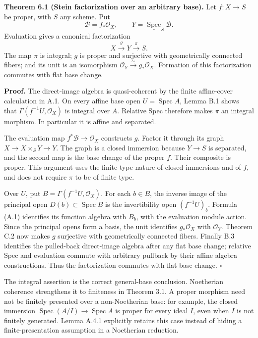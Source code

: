 \documentclass[11pt]{article}
\begin{document}
\textbf{Theorem 6.1 (Stein factorization over an arbitrary base).} Let
\(f:X\to S\) be proper, with \(S\) any scheme. Put \[
\mathcal B=f_*\mathcal O_X,
\qquad Y=\underline{\operatorname{Spec}}_S\mathcal B.
\] Evaluation gives a canonical factorization \[
X\xrightarrow{g}Y\xrightarrow{\pi}S.
\] The map \(\pi\) is integral; \(g\) is proper and surjective with
geometrically connected fibers; and its unit is an isomorphism
\(\mathcal O_Y\xrightarrow{\sim}g_*\mathcal O_X\). Formation of this
factorization commutes with flat base change.

\textbf{Proof.} The direct-image algebra is quasi-coherent by the finite
affine-cover calculation in A.1. On every affine base open
\(U=\operatorname{Spec}A\), Lemma B.1 shows that
\(\Gamma(f^{-1}U,\mathcal O_X)\) is integral over \(A\). Relative Spec
therefore makes \(\pi\) an integral morphism. In particular it is affine
and separated.

The evaluation map \(f^*\mathcal B\to\mathcal O_X\) constructs \(g\).
Factor it through its graph \(X\to X\times_SY\to Y\). The graph is a
closed immersion because \(Y\to S\) is separated, and the second map is
the base change of the proper \(f\). Their composite is proper. This
argument uses the finite-type nature of closed immersions and of \(f\),
and does not require \(\pi\) to be of finite type.

Over \(U\), put \(B=\Gamma(f^{-1}U,\mathcal O_X)\). For each \(b\in B\),
the inverse image of the principal open
\(D(b)\subset\operatorname{Spec}B\) is the invertibility open
\((f^{-1}U)_b\). Formula (A.1) identifies its function algebra with
\(B_b\), with the evaluation module action. Since the principal opens
form a basis, the unit identifies \(g_*\mathcal O_X\) with
\(\mathcal O_Y\). Theorem C.2 now makes \(g\) surjective with
geometrically connected fibers. Finally B.3 identifies the pulled-back
direct-image algebra after any flat base change; relative Spec and
evaluation commute with arbitrary pullback by their affine algebra
constructions. Thus the factorization commutes with flat base change.
\(\square\)

The integral assertion is the correct general-base conclusion.
Noetherian coherence strengthens it to finiteness in Theorem 3.1. A
proper morphism need not be finitely presented over a non-Noetherian
base: for example, the closed immersion
\(\operatorname{Spec}(A/I)\to\operatorname{Spec}A\) is proper for every
ideal \(I\), even when \(I\) is not finitely generated. Lemma A.4.1
explicitly retains this case instead of hiding a finite-presentation
assumption in a Noetherian reduction.
\end{document}
